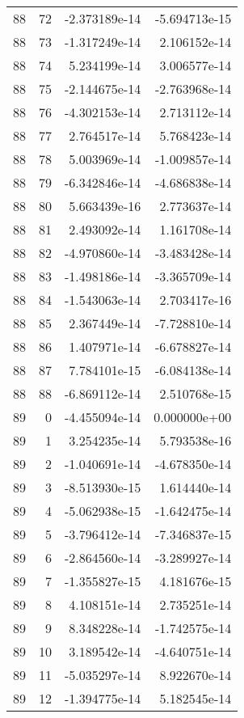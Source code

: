 \begin{tabular}{rrrr}
  88 &   72 & -2.373189e-14 & -5.694713e-15 \\
  88 &   73 & -1.317249e-14 &  2.106152e-14 \\
  88 &   74 &  5.234199e-14 &  3.006577e-14 \\
  88 &   75 & -2.144675e-14 & -2.763968e-14 \\
  88 &   76 & -4.302153e-14 &  2.713112e-14 \\
  88 &   77 &  2.764517e-14 &  5.768423e-14 \\
  88 &   78 &  5.003969e-14 & -1.009857e-14 \\
  88 &   79 & -6.342846e-14 & -4.686838e-14 \\
  88 &   80 &  5.663439e-16 &  2.773637e-14 \\
  88 &   81 &  2.493092e-14 &  1.161708e-14 \\
  88 &   82 & -4.970860e-14 & -3.483428e-14 \\
  88 &   83 & -1.498186e-14 & -3.365709e-14 \\
  88 &   84 & -1.543063e-14 &  2.703417e-16 \\
  88 &   85 &  2.367449e-14 & -7.728810e-14 \\
  88 &   86 &  1.407971e-14 & -6.678827e-14 \\
  88 &   87 &  7.784101e-15 & -6.084138e-14 \\
  88 &   88 & -6.869112e-14 &  2.510768e-15 \\
  89 &    0 & -4.455094e-14 &  0.000000e+00 \\
  89 &    1 &  3.254235e-14 &  5.793538e-16 \\
  89 &    2 & -1.040691e-14 & -4.678350e-14 \\
  89 &    3 & -8.513930e-15 &  1.614440e-14 \\
  89 &    4 & -5.062938e-15 & -1.642475e-14 \\
  89 &    5 & -3.796412e-14 & -7.346837e-15 \\
  89 &    6 & -2.864560e-14 & -3.289927e-14 \\
  89 &    7 & -1.355827e-15 &  4.181676e-15 \\
  89 &    8 &  4.108151e-14 &  2.735251e-14 \\
  89 &    9 &  8.348228e-14 & -1.742575e-14 \\
  89 &   10 &  3.189542e-14 & -4.640751e-14 \\
  89 &   11 & -5.035297e-14 &  8.922670e-14 \\
  89 &   12 & -1.394775e-14 &  5.182545e-14 \\

\end{tabular}
